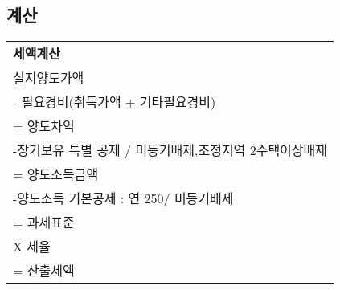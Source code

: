 \documentclass{oblivoir}
\begin{document}
\subsection{계산}\label{uxacc4uxc0b0}

\begin{table}[]
  \begin{tabular}{l}
  \rowcolor[HTML]{F0F0F0} 
  {\color[HTML]{3F3F3F} \textbf{세액계산}}                    \\
  \rowcolor[HTML]{FDFDFD} 
  {\color[HTML]{3F3F3F} 실지양도가액}                           \\
  \rowcolor[HTML]{F7F7F7} 
  {\color[HTML]{3F3F3F} - 필요경비(취득가액 + 기타필요경비)}            \\
  \rowcolor[HTML]{FDFDFD} 
  {\color[HTML]{3F3F3F} = 양도차익}                           \\
  \rowcolor[HTML]{F7F7F7} 
  {\color[HTML]{3F3F3F} -장기보유 특별 공제 / 미등기배제,조정지역 2주택이상배제} \\
  \rowcolor[HTML]{FDFDFD} 
  {\color[HTML]{3F3F3F} = 양도소득금액}                         \\
  \rowcolor[HTML]{F7F7F7} 
  {\color[HTML]{3F3F3F} -양도소득 기본공제 : 연 250/ 미등기배제}        \\
  \rowcolor[HTML]{FDFDFD} 
  {\color[HTML]{3F3F3F} = 과세표준}                           \\
  \rowcolor[HTML]{F7F7F7} 
  {\color[HTML]{3F3F3F} X 세율}                             \\
  \rowcolor[HTML]{FDFDFD} 
  {\color[HTML]{3F3F3F} = 산출세액}                          
  \end{tabular}
  \end{table}
\end{document}
